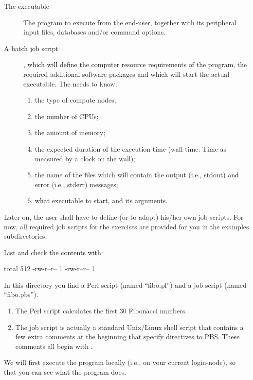 \begin{description}
  \item[The executable] The program to execute from the end-user, together with its peripheral input files, databases and/or command options.
  \item[A batch job script], which will define the computer resource requirements of the program, the required additional software packages and which will start the actual executable.  The \hpc needs to know:
    \begin{enumerate}
      \item  the type of compute nodes;
      \item  the number of CPUs;
      \item  the amount of memory;
      \item  the expected duration of the execution time (wall time: Time as measured by a clock on the wall);
      \item  the name of the files which will contain the output (i.e., stdout) and error (i.e., stderr) messages;
      \item  what executable to start, and its arguments.
    \end{enumerate}
\end{description}

Later on, the \hpc user shall have to define (or to adapt) his/her own
job scripts. For now, all required job scripts for the
exercises are provided for you in the examples subdirectories.

List and check the contents with:

\begin{prompt}
total 512
-rw-r--r-- 1 %
-rw-r--r-- 1 %
\end{prompt}

In this directory you find a Perl script (named ``fibo.pl'') and a job script
(named ``fibo.pbs'').

\begin{enumerate}
\item  The Perl script calculates the first 30 Fibonacci numbers.
\item  The job script is actually a standard Unix/Linux shell script that
  contains a few extra comments at the beginning that specify directives to
  PBS.  These comments all begin with .
\end{enumerate}

We will first execute the program locally (i.e., on your current login-node),
so that you can see what the program does.

